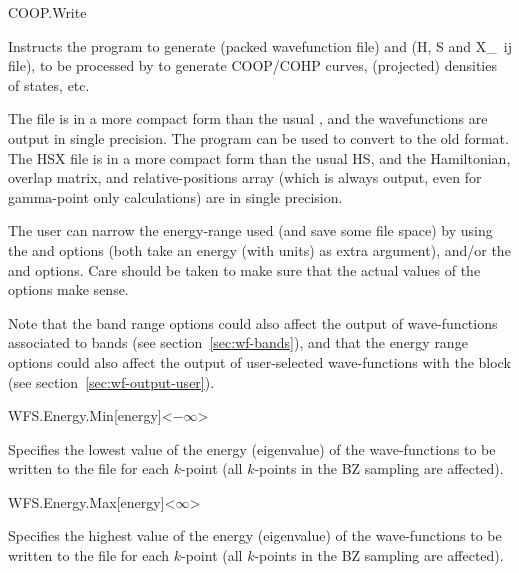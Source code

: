 \begin{fdflogicalF}{COOP.Write}

  Instructs the program to generate  (packed
  wavefunction file) and   (H, S and X\_~{ij} file),
  to be processed by  to generate COOP/COHP curves,
  (projected) densities of states, etc.

  The  file is in a more compact form than the usual
  , and the wavefunctions are output in single
  precision. The  program can be used to
  convert to the old format.  The HSX file is in a more compact form
  than the usual HS, and the Hamiltonian, overlap matrix, and
  relative-positions array (which is always output, even for
  gamma-point only calculations) are in single precision.

  The user can narrow the energy-range used (and save some file space)
  by using the  and  options
  (both take an energy (with units) as extra argument), and/or the
   and  options. Care should be
  taken to make sure that the actual values of the options make sense.

  Note that the band range options could also affect the output of
  wave-functions associated to bands (see section~\ref{sec:wf-bands}),
  and that the energy range options could also affect the output of
  user-selected wave-functions with the  block
  (see section~\ref{sec:wf-output-user}).

\end{fdflogicalF}


\begin{fdfentry}{WFS.Energy.Min}[energy]<$-\infty$>

  Specifies the lowest value of the energy (eigenvalue) of the
  wave-functions to be written to the file
   for each $k$-point (all $k$-points in
  the BZ sampling are affected).

\end{fdfentry}

\begin{fdfentry}{WFS.Energy.Max}[energy]<$\infty$>

  Specifies the highest value of the energy (eigenvalue) of the
  wave-functions to be written to the file  for
  each $k$-point (all $k$-points in the BZ sampling are affected).

\end{fdfentry}
